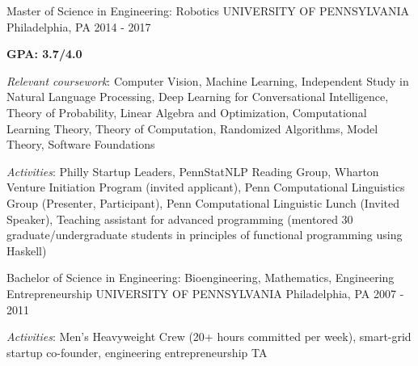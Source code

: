 \begin{cventries}
  \cventry
    {Master of Science in Engineering: Robotics}
    {UNIVERSITY OF PENNSYLVANIA}
    {Philadelphia, PA}
    {2014 - 2017}
    {
      \begin{cvitems}
        \item \textbf{GPA: 3.7/4.0}
        \item \textit{Relevant coursework}: Computer Vision, Machine Learning, Independent Study in Natural Language Processing, Deep Learning for Conversational Intelligence, Theory of Probability, Linear Algebra and Optimization, Computational Learning Theory, Theory of Computation, Randomized Algorithms, Model Theory, Software Foundations
        \item \textit{Activities}: Philly Startup Leaders, PennStatNLP Reading Group, Wharton Venture Initiation Program (invited applicant), Penn Computational Linguistics Group (Presenter, Participant),  Penn Computational Linguistic Lunch (Invited Speaker), Teaching assistant for advanced programming (mentored 30 graduate/undergraduate students in principles of functional programming using Haskell)
      \end{cvitems}
    }
  \cventry
    {Bachelor of Science in Engineering: Bioengineering, Mathematics, Engineering Entrepreneurship}
    {UNIVERSITY OF PENNSYLVANIA}
    {Philadelphia, PA}
    {2007 - 2011}
    {
      \begin{cvitems}
        \item \textit{Activities}: Men’s Heavyweight Crew (20+ hours committed per week), smart-grid startup co-founder, engineering entrepreneurship TA
      \end{cvitems}
    }
\end{cventries}
